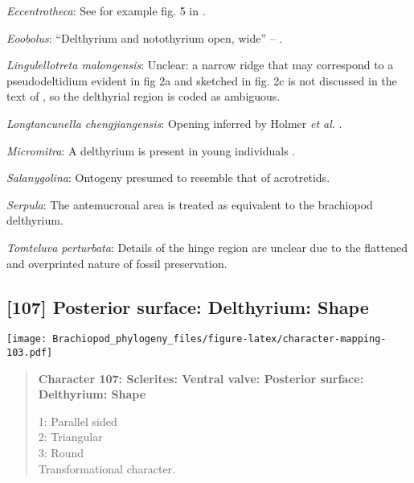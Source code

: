 \documentclass[openany]{book}
\theoremstyle{definition}
\theoremstyle{definition}
\theoremstyle{definition}
\theoremstyle{remark}
\begin{document}
\hypertarget{Eccentrotheca-coding-106}{}
\emph{Eccentrotheca}: See for example fig. 5 in
\citet{Balthasar2009Thebrachiopod}.

\hypertarget{Eoobolus-coding-106}{}
\emph{Eoobolus}: ``Delthyrium and notothyrium open, wide'' --
\citet{Cooper1976LowerCambrian}.

\hypertarget{Lingulellotreta_malongensis-coding-106}{}
\emph{Lingulellotreta malongensis}: Unclear: a narrow ridge that may
correspond to a pseudodeltidium evident in fig 2a and sketched in fig.
2c is not discussed in the text of \citet{Zhang2011Theexceptionally}, so
the delthyrial region is coded as ambiguous.

\hypertarget{Longtancunella_chengjiangensis-coding-106}{}
\emph{Longtancunella chengjiangensis}: Opening inferred by Holmer
\emph{et al}. \citeyearpar{Holmer2008TheEarly}.

\hypertarget{Micromitra-coding-106}{}
\emph{Micromitra}: A delthyrium is present in young individuals
\citep{Balthasar2004Shellstructure}.

\hypertarget{Salanygolina-coding-106}{}
\emph{Salanygolina}: Ontogeny presumed to resemble that of acrotretids.

\hypertarget{Serpula-coding-106}{}
\emph{Serpula}: The antemucronal area \citep{Schwabe2010} is treated as
equivalent to the brachiopod delthyrium.

\hypertarget{Tomteluva_perturbata-coding-106}{}
\emph{Tomteluva perturbata}: Details of the hinge region are unclear due
to the flattened and overprinted nature of fossil preservation.

\subsection*{{[}107{]} Posterior surface: Delthyrium:
Shape}\label{posterior-surface-delthyrium-shape}

\texttt{[image: Brachiopod\_phylogeny\_files/figure-latex/character-mapping-103.pdf]}

\begin{quote}
\textbf{Character 107: Sclerites: Ventral valve: Posterior surface:
Delthyrium: Shape}

1: Parallel sided\\
2: Triangular\\
3: Round\\
Transformational character.
\end{quote}
\end{document}
